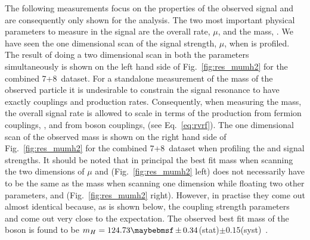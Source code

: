 The following measurements focus on the properties of the observed signal and are consequently only shown for the \MFM analysis. The two most important physical parameters to measure in the signal are the overall rate, $\mu$, and the mass, \mH. We have seen the one dimensional \NLL scan of the signal strength, $\mu$, when \mH is profiled. The result of doing a two dimensional \NLL scan in both the parameters simultaneously is shown on the left hand side of Fig.~\ref{fig:res_mumh2} for the combined 7+8~\TeV dataset. For a standalone measurement of the mass of the observed particle it is undesirable to constrain the signal resonance to have exactly \SM couplings and production rates. Consequently, when measuring the mass, the overall signal rate is allowed to scale in terms of the production from fermion couplings, \RF, and from boson couplings, \RV (see Eq.~\ref{eq:rvrf}). The one dimensional \NLL scan of the observed mass is shown on the right hand side of Fig.~\ref{fig:res_mumh2} for the combined 7+8~\TeV dataset when profiling the \RV and \RF signal strengths. It should be noted that in principal the best fit mass when scanning the two dimensions of $\mu$ and \mH (Fig.~\ref{fig:res_mumh2} left) does not necessarily have to be the same as the mass when scanning one dimension \mH while floating two other parameters, \RV and \RF (Fig.~\ref{fig:res_mumh2} right). However, in practise they come out almost identical because, as is shown below, the coupling strength parameters \RV and \RF come out very close to the \SM expectation. The observed best fit mass of the boson is found to be $\mH=124.73\pm0.34$(stat)$\pm0.15$(syst)~\GeV. 

